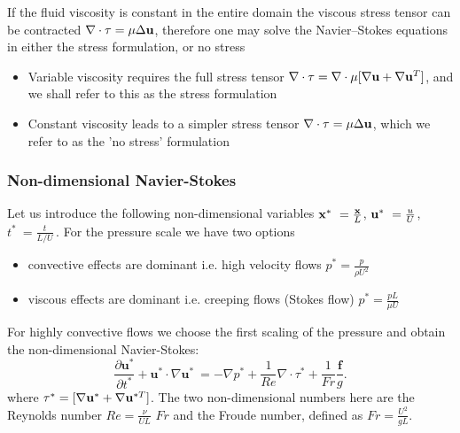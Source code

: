 If the fluid viscosity is constant in the entire domain the viscous stress tensor can be contracted $\nabla\cdot\tau=\mu\Delta \mathbf{u}$, therefore one may solve the Navier--Stokes equations in either the stress formulation, or no stress

\begin{itemize}
\item Variable viscosity requires the full stress tensor $\nabla \cdot \tau=\nabla \cdot \mu[\nabla \mathbf{u}+\nabla \mathbf{u}^{T}]$, and we shall refer to this as the stress formulation
\item Constant viscosity leads to a simpler stress tensor $\nabla \cdot \tau=\mu\Delta \mathbf{u}$, which we refer to as the 'no stress' formulation
\end{itemize}

\subsubsection{Non-dimensional Navier-Stokes}
Let us introduce the following non-dimensional variables $\mathbf{x}^*\ = \frac{\mathbf{x}}{L}$, $\mathbf{u}^*\ = \frac{u}{U}$, $t^*\ = \frac{t}{L/U}\,$.
For the pressure scale we have two options 
\begin{itemize}
\item convective effects are dominant i.e. high velocity flows
$ p^* = \frac{p}{\rho U^2} $
\item viscous effects are dominant i.e. creeping flows (Stokes flow)
$ p^* = \frac{p L}{\mu U} $
\end{itemize}
For highly convective flows we choose the first scaling of the pressure and obtain the non-dimensional Navier-Stokes:
\begin{equation}\label{eq:NS_nondim}
\frac{\partial \mathbf{u^*}}{\partial t^*} + \mathbf{u^*} \cdot \nabla \mathbf{u^*}\ = -\nabla p^* + \frac{1}{Re} \nabla\cdot \tau^* + \frac{1}{Fr}\frac{\mathbf{f}}{g}.
\end{equation}
where $ \tau^*=[\nabla \mathbf{u}^*+\nabla \mathbf{u}^{*T}]$.
The two non-dimensional numbers here are the Reynolds number $Re=\frac{\nu}{U L}$ $Fr$ and the Froude number, defined as $Fr = \frac{U^2}{gL}$.
%
